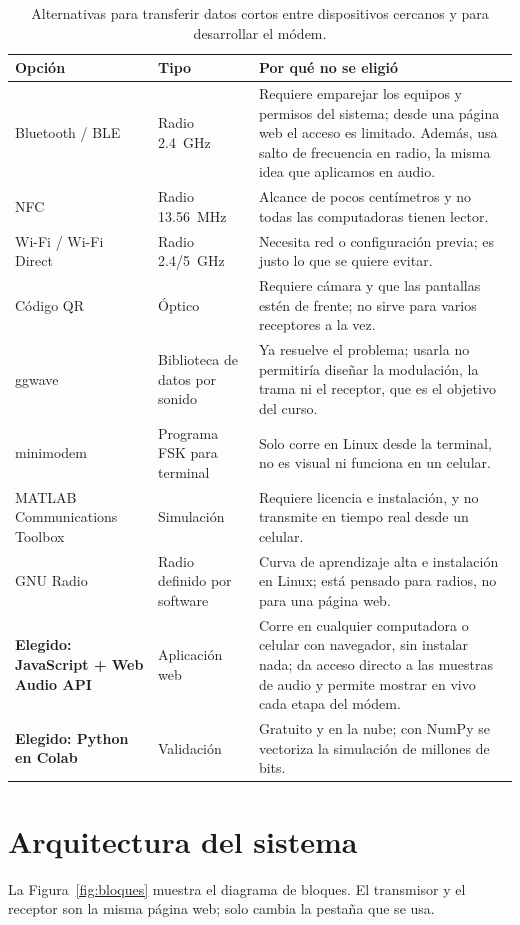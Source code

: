 \documentclass[10pt,twocolumn,letterpaper]{article}
\begin{document}
\begin{table}[t]
\centering\small
\caption{Alternativas para transferir datos cortos entre dispositivos cercanos y para desarrollar el módem.}\label{tab:alt}
\begin{tabularx}{\textwidth}{@{}>{\raggedright\arraybackslash}p{3.6cm}>{\raggedright\arraybackslash}p{2.5cm}X@{}}
\toprule
\textbf{Opción} & \textbf{Tipo} & \textbf{Por qué no se eligió} \\
\midrule
Bluetooth / BLE \cite{bluetooth} & Radio 2.4~GHz & Requiere emparejar los equipos y permisos del sistema; desde una página web el acceso es limitado. Además, usa salto de frecuencia en radio, la misma idea que aplicamos en audio. \\
NFC & Radio 13.56~MHz & Alcance de pocos centímetros y no todas las computadoras tienen lector. \\
Wi-Fi / Wi-Fi Direct & Radio 2.4/5~GHz & Necesita red o configuración previa; es justo lo que se quiere evitar. \\
Código QR & Óptico & Requiere cámara y que las pantallas estén de frente; no sirve para varios receptores a la vez. \\
ggwave \cite{ggwave} & Biblioteca de datos por sonido & Ya resuelve el problema; usarla no permitiría diseñar la modulación, la trama ni el receptor, que es el objetivo del curso. \\
minimodem \cite{minimodem} & Programa FSK para terminal & Solo corre en Linux desde la terminal, no es visual ni funciona en un celular. \\
MATLAB Communications Toolbox & Simulación & Requiere licencia e instalación, y no transmite en tiempo real desde un celular. \\
GNU Radio & Radio definido por software & Curva de aprendizaje alta e instalación en Linux; está pensado para radios, no para una página web. \\
\midrule
\textbf{Elegido: JavaScript + Web Audio API} & Aplicación web & Corre en cualquier computadora o celular con navegador, sin instalar nada; da acceso directo a las muestras de audio y permite mostrar en vivo cada etapa del módem. \\
\textbf{Elegido: Python en Colab} & Validación & Gratuito y en la nube; con NumPy se vectoriza la simulación de millones de bits. \\
\bottomrule
\end{tabularx}
\end{table}

\section{Arquitectura del sistema}
La Figura~\ref{fig:bloques} muestra el diagrama de bloques. El transmisor y el receptor son la misma página web; solo cambia la pestaña que se usa.
\end{document}
